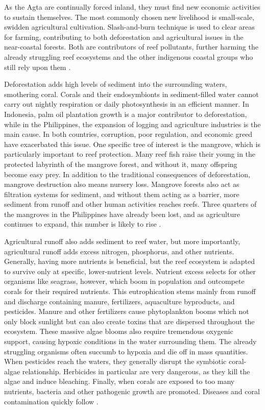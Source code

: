 \documentclass{book}\usepackage{knitr}
\begin{document}
\begin{knitrout}
\begin{kframe}
As the Agta are continually forced inland, they must find new economic activities to sustain themselves. The most commonly chosen new livelihood is small-scale, swidden agricultural cultivation. Slash-and-burn technique is used to clear areas for farming, contributing to both deforestation and agricultural issues in the near-coastal forests. Both are contributors of reef pollutants, further harming the already struggling reef ecosystems and the other indigenous coastal groups who still rely upon them \citep{RePEc:gam:jsusta:v:12:y:2020:i:19:p:7983-:d:420111}.

Deforestation adds high levels of sediment into the surrounding waters, smothering coral. Corals and their endosymbionts in sediment-filled water cannot carry out nightly respiration or daily photosynthesis in an efficient manner. In Indonesia, palm oil plantation growth is a major contributor to deforestation, while in the Philippines, the expansion of logging and agriculture industries is the main cause. In both countries, corruption, poor regulation, and economic greed have exacerbated this issue. One specific tree of interest is the mangrove, which is particularly important to reef protection. Many reef fish raise their young in the protected labyrinth of the mangrove forest, and without it, many offspring become easy prey. In addition to the traditional consequences of deforestation, mangrove destruction also means nursery loss. Mangrove forests also act as filtration systems for sediment, and without them acting as a barrier, more sediment from runoff and other human activities reaches reefs. Three quarters of the mangroves in the Philippines have already been lost, and as agriculture continues to expand, this number is likely to rise \citep{coralreefalliance_2021}.

	Agricultural runoff also adds sediment to reef water, but more importantly, agricultural runoff adds excess nitrogen, phosphorus, and other nutrients. Generally, having more nutrients is beneficial, but the reef ecosystem is adapted to survive only at specific, lower-nutrient levels. Nutrient excess selects for other organisms like seagrass, however, which boom in population and outcompete corals for their required nutrients. This eutrophication stems mainly from runoff and discharge containing manure, fertilizers, aquaculture byproducts, and pesticides. Manure and other fertilizers cause phytoplankton booms which not only block sunlight but can also create toxins that are dispersed throughout the ecosystem. These massive algae blooms also require tremendous oxygenic support, causing hypoxic conditions in the water surrounding them. The already struggling organisms often succumb to hypoxia and die off in mass quantities. When pesticides reach the waters, they generally disrupt the symbiotic coral-algae relationship. Herbicides in particular are very dangerous, as they kill the algae and induce bleaching. Finally, when corals are exposed to too many nutrients, bacteria and other pathogenic growth are promoted. Diseases and coral contamination quickly follow \citep{4884777420100401}.


\end{kframe}
\end{knitrout}
\end{document}
